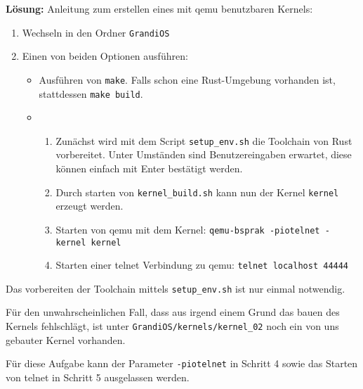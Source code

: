 \begin{description}
\pagebreak
\textbf{Lösung:}
Anleitung zum erstellen eines mit qemu benutzbaren Kernels:
\begin{enumerate}
	\item Wechseln in den Ordner \texttt{GrandiOS}
        \item Einen von beiden Optionen ausführen:
          \begin{itemize}
            \item Ausführen von \texttt{make}. Falls schon eine Rust-Umgebung vorhanden ist, stattdessen \texttt{make build}.
            \item \begin{enumerate}
              \item Zunächst wird mit dem Script \texttt{setup\_env.sh} die Toolchain von Rust vorbereitet. Unter Umständen sind Benutzereingaben erwartet, diese können einfach mit Enter bestätigt werden.
              \item Durch starten von \texttt{kernel\_build.sh} kann nun der Kernel \texttt{kernel} erzeugt werden.
              \item Starten von qemu mit dem Kernel: \texttt{qemu-bsprak -piotelnet -kernel kernel}
              \item Starten einer telnet Verbindung zu qemu: \texttt{telnet localhost 44444}
            \end{enumerate}
          \end{itemize}
\end{enumerate}
Das vorbereiten der Toolchain mittels \texttt{setup\_env.sh} ist nur einmal notwendig.

Für den unwahrscheinlichen Fall, dass aus irgend einem Grund das bauen des Kernels fehlschlägt, ist unter {\texttt{GrandiOS/kernels/kernel\_02}} noch ein von uns gebauter Kernel vorhanden.

Für diese Aufgabe kann der Parameter \texttt{-piotelnet} in Schritt 4 sowie das Starten von telnet in Schritt 5 ausgelassen werden.


\end{description}
